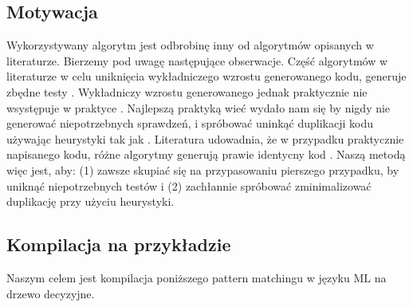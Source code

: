 \documentclass{article}
\begin{document}
\subsection{Motywacja}
Wykorzystywany algorytm jest odbrobinę inny od algorytmów opisanych w literaturze. Bierzemy pod uwagę następujące obserwacje. Część algorytmów w literaturze w celu uniknięcia wykładniczego wzrostu generowanego kodu, generuje zbędne testy \cite{Augustsson__1985}. Wykładniczy wzrostu generowanego jednak praktycznie nie wsystępuje w praktyce \cite{Scott__Ramsey__2000}. Najlepszą praktyką wieć wydało nam się by nigdy nie generować niepotrzebnych sprawdzeń, i spróbować uninkąć duplikacji kodu używając heurystyki tak jak \cite{Maranget__2008}. Literatura udowadnia, że w przypadku praktycznie napisanego kodu, różne algorytmy generują prawie identycny kod  \cite{Scott__Ramsey__2000, Maranget__2008}. Naszą metodą więc jest, aby: (1) zawsze skupiać się na przypasowaniu pierszego przypadku, by uniknąć niepotrzebnych testów i (2) zachłannie spróbować zminimalizować duplikację przy użyciu heurystyki.

\subsection{Kompilacja na przykładzie}
Naszym celem jest kompilacja poniższego pattern matchingu w języku ML na drzewo decyzyjne.
\end{document}
